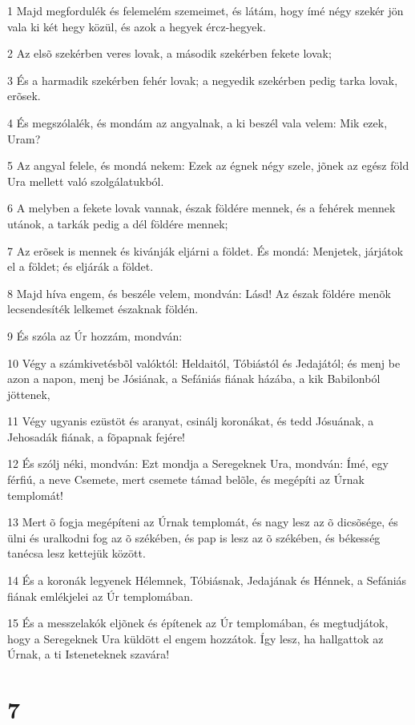 \par 1 Majd megfordulék és felemelém szemeimet, és látám, hogy ímé négy szekér jön vala ki két hegy közül, és azok a hegyek ércz-hegyek.
\par 2 Az elsõ szekérben veres lovak, a második szekérben fekete lovak;
\par 3 És a harmadik szekérben fehér lovak; a negyedik szekérben pedig tarka lovak, erõsek.
\par 4 És megszólalék, és mondám az angyalnak, a ki beszél vala velem: Mik ezek, Uram?
\par 5 Az angyal felele, és mondá nekem: Ezek az égnek négy szele, jõnek az egész föld Ura mellett való szolgálatukból.
\par 6 A melyben a fekete lovak vannak, észak földére mennek, és a fehérek mennek utánok, a tarkák pedig a dél földére mennek;
\par 7 Az erõsek is mennek és kivánják eljárni a földet. És mondá: Menjetek, járjátok el a földet; és eljárák a földet.
\par 8 Majd híva engem, és beszéle velem, mondván: Lásd! Az észak földére menõk lecsendesíték lelkemet északnak földén.
\par 9 És szóla az Úr hozzám, mondván:
\par 10 Végy a számkivetésbõl valóktól: Heldaitól, Tóbiástól és Jedajától; és menj be azon a napon, menj be Jósiának, a Sefániás fiának házába, a kik Babilonból jöttenek,
\par 11 Végy ugyanis ezüstöt és aranyat, csinálj koronákat, és tedd Jósuának, a Jehosadák fiának, a fõpapnak fejére!
\par 12 És szólj néki, mondván: Ezt mondja a Seregeknek Ura, mondván: Ímé, egy férfiú, a neve Csemete, mert csemete támad belõle, és megépíti az Úrnak templomát!
\par 13 Mert õ fogja megépíteni az Úrnak templomát, és nagy lesz az õ dicsõsége, és ülni és uralkodni fog az õ székében, és pap is lesz az õ székében, és békesség tanécsa lesz kettejük között.
\par 14 És a koronák legyenek Hélemnek, Tóbiásnak, Jedajának és Hénnek, a Sefániás fiának emlékjelei az Úr templomában.
\par 15 És a messzelakók eljõnek és építenek az Úr templomában, és megtudjátok, hogy a Seregeknek Ura küldött el engem hozzátok. Így lesz, ha hallgattok az Úrnak, a ti Isteneteknek szavára!

\chapter{7}

